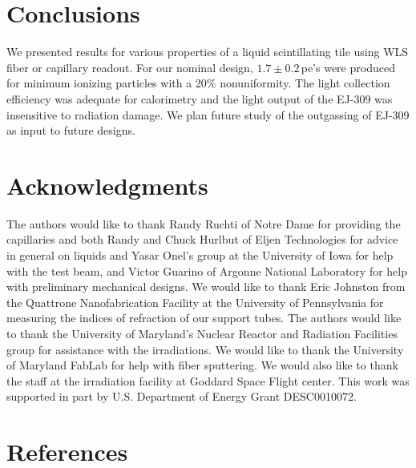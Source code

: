 \documentclass[review]{elsarticle}
\begin{document}
\section{Conclusions}

We presented results for various properties of a liquid scintillating tile using WLS fiber or capillary readout. For our nominal design, $1.7\pm 0.2$\,pe's
were produced for minimum ionizing particles with a 20\% nonuniformity.
The light collection efficiency was adequate for calorimetry and the light output of the EJ-309 was insensitive to radiation damage.  We plan future
study of the outgassing of EJ-309 as input to future designs.


\section{Acknowledgments}
The authors would like to thank Randy Ruchti of Notre Dame for
providing the capillaries and both Randy and Chuck Hurlbut of Eljen
Technologies for
advice in general on liquids and
Yasar Onel's group at the University of
Iowa for help with the test beam, and Victor Guarino of Argonne National Laboratory for
help with preliminary mechanical designs.
We would like to thank Eric
Johnston from the Quattrone Nanofabrication Facility at the University
of Pennsylvania for measuring the indices of refraction of our support
tubes. 
The authors would like to thank 
the University of Maryland's Nuclear Reactor and Radiation
Facilities group for assistance
with the irradiations.
 We would like to thank the University of Maryland
FabLab for help with fiber sputtering.
We would also like to thank the staff at the irradiation facility at Goddard Space Flight center.
This work was supported in part by U.S. Department of Energy
Grant DESC0010072.

\section*{References}


\end{document}
